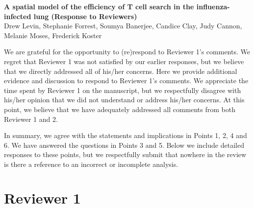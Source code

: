 \documentclass[10pt]{article}
\date{}
\begin{document}
\begin{flushleft}
{\Large
\textbf{A spatial model of the efficiency of T cell search in the influenza-infected lung (Response to Reviewers)}
}
\\
Drew Levin, 
Stephanie Forrest, 
Soumya Banerjee,
Candice Clay,
Judy Cannon, 
Melanie Moses, 
Frederick Koster
\end{flushleft}
\vspace{0.5cm}




We are grateful for the opportunity to (re)respond to Reviewer 1's
comments. We regret that Reviewer 1 was not satisfied by our
earlier responses, but we believe that we directly addressed all of
his/her concerns.  Here we provide additional evidence and discussion
to respond to Reviewer 1's comments.  We appreciate the time
spent by Reviewer 1 on the manuscript, but we respectfully disagree
with his/her opinion that we did not understand or address his/her
concerns.  At this point, we believe that we have adequately addressed
all comments from both Reviewer 1 and 2.

In summary, we agree with the statements and implications in Points 1,
2, 4 and 6. We have answered the questions in Points 3 and 5. Below we
include detailed responses to these points, but we respectfully submit
that nowhere in the review is there a reference to an incorrect
or incomplete analysis.

\section*{Reviewer 1}

\end{document}
